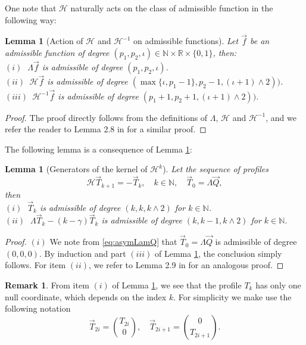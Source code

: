 \documentclass[11pt]{aims}
\newtheorem{lemma}[theorem]{Lemma}
\theoremstyle{definition}
\newtheorem{remark}[theorem]{Remark}
\numberwithin{equation}{section}
\begin{document}
One note that ${\mathscr{H}}$ naturally acts on the class of admissible function in the following way:
\begin{lemma}[Action of ${\mathscr{H}}$ and ${\mathscr{H}}^{-1}$ on admissible functions] \label{lemm:actionH} Let $\vec f$ be an admissible function of degree $(p_1, p_2, \iota) \in \mathbb{N} \times \mathbb{R} \times \{0, 1\}$, then:\\
$(i)\;$ $\Lambda \vec f$ is admissible of degree $(p_1, p_2, \iota)$.\\
$(ii)\,$ ${\mathscr{H}} \vec f$ is admissible of degree $(\max\{\iota ,p_1 - 1\}, p_2 - 1, (\iota + 1)\wedge 2))$.\\
$(iii)\,$ ${\mathscr{H}}^{-1} \vec f$ is admissible of degree $(p_1 + 1, p_2 + 1, (\iota + 1)\wedge 2))$.
\end{lemma}
\begin{proof} The proof directly follows from the definitions of $\Lambda$, ${\mathscr{H}}$ and ${\mathscr{H}}^{-1}$, and we refer the reader to Lemma 2.8 in \cite{IGN16} for a similar proof.
\end{proof}

The following lemma is a consequence of Lemma \ref{lemm:actionH}:
\begin{lemma}[Generators of the kernel of ${\mathscr{H}}^k$] \label{lemm:GenLk} Let the sequence of profiles 
\begin{equation}\label{def:Tk}
{\mathscr{H}} \vec T_{k+1} = - \vec T_k, \quad k \in \mathbb{N}, \quad \vec T_0 = \Lambda \vec Q,
\end{equation}
then\\
$(i)\;$ $\vec T_k$ is admissible of degree $(k,k, k\wedge 2)$ for $k \in \mathbb{N}$.\\
$(ii)\;$ $\Lambda \vec T_k - (k - \gamma)\vec T_k$ is admissible of degree $(k, k-1, k\wedge2)$ for $k \in \mathbb{N}$.
\end{lemma}
\begin{proof} $(i)$ We note from \eqref{eq:asymLamQ} that $\vec T_0 = \Lambda \vec Q$ is admissible of degree $(0,0, 0)$. By induction and part $(iii)$ of Lemma \ref{lemm:actionH}, the conclusion simply follows. For item $(ii)$, we refer to Lemma 2.9 in \cite{IGN16} for an analogous proof.
\end{proof}
\begin{remark} From item $(i)$ of Lemma \ref{lemm:GenLk}, we see that the profile $T_k$ has only one null coordinate, which depends on the index $k$. For simplicity we make use the following notation
\begin{equation}\label{eq:formTk}
\vec T_{2i} = \binom{T_{2i}}{0}, \quad \vec T_{2i + 1} = \binom{0}{T_{2i + 1}}.
\end{equation}

\end{remark}
\end{document}
